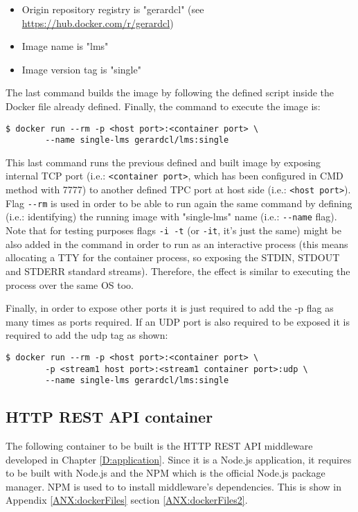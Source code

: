 \begin{itemize}
\item Origin repository registry is "gerardcl" (see \url{https://hub.docker.com/r/gerardcl})
\item Image name is "lms"
\item Image version tag is "single"
\end{itemize}

The last command builds the image by following the defined script inside the Docker file already defined. Finally, the command to execute the image is:

\begin{verbatim}
$ docker run --rm -p <host port>:<container port> \
		--name single-lms gerardcl/lms:single
\end{verbatim}

This last command runs the previous defined and built image by exposing internal TCP port (i.e.: \verb|<container port>|, which has been configured in CMD method with 7777) to another defined TPC port at host side (i.e.: \verb|<host port>|). Flag \verb|--rm| is used in order to be able to run again the same command by defining (i.e.: identifying) the running image with "single-lms" name (i.e.: \verb|--name| flag). Note that for testing purposes flags \verb|-i -t| (or \verb|-it|, it's just the same) might be also added in the command in order to run as an interactive process (this means allocating a TTY for the container process, so exposing the STDIN, STDOUT and STDERR standard streams). Therefore, the effect is similar to executing the process over the same OS too.

Finally, in order to expose other ports it is just required to add the -p flag as many times as ports required. If an UDP port is also required to be exposed it is required to add the udp tag as shown:

\begin{verbatim}
$ docker run --rm -p <host port>:<container port> \
		-p <stream1 host port>:<stream1 container port>:udp \
		--name single-lms gerardcl/lms:single
\end{verbatim}


\subsection{HTTP REST API container}

The following container to be built is the HTTP REST API middleware developed in Chapter \ref{D:application}. Since it is a Node.js application, it requires to be built with Node.js and the NPM which is the official Node.js package manager. NPM is used to to install middleware's dependencies. This is show in Appendix \ref{ANX:dockerFiles} section \ref{ANX:dockerFiles2}.


